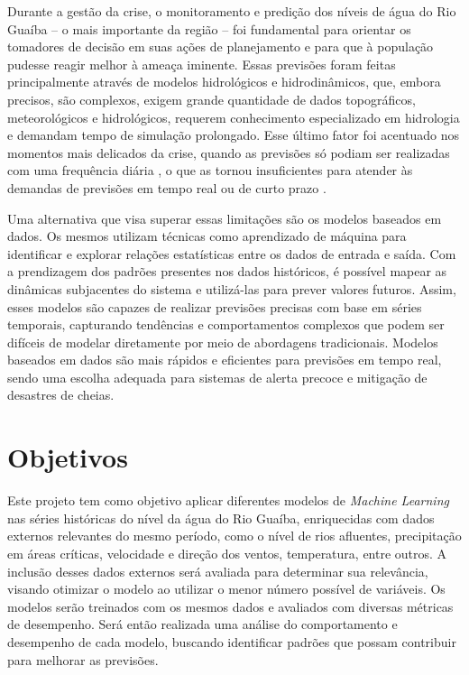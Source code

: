 \documentclass[
	12pt,				%
	openright,			%
	a4paper,			%
	english,			%
	french,				%
	spanish,			%
	brazil				%
	]{article}
\begin{document}
Durante a gestão da crise, o monitoramento e predição dos níveis de água do Rio Guaíba – o mais importante da região – 
foi fundamental para orientar os tomadores de decisão em suas ações de planejamento e para que à população pudesse 
reagir melhor à ameaça iminente. Essas previsões foram feitas principalmente através de modelos hidrológicos e 
hidrodinâmicos, que, embora precisos, são complexos, exigem grande quantidade de dados topográficos, meteorológicos e 
hidrológicos, requerem conhecimento especializado em hidrologia e demandam tempo de simulação prolongado. Esse último 
fator foi acentuado nos momentos mais delicados da crise, quando as previsões só podiam ser realizadas com uma 
frequência diária \cite{iph}, o que as tornou insuficientes para atender às demandas de previsões em tempo real ou de 
curto prazo \cite{atashi}.

Uma alternativa que visa superar essas limitações são os modelos baseados em dados. Os mesmos utilizam técnicas como 
aprendizado de máquina para identificar e explorar relações estatísticas entre os dados de entrada e saída. Com a 
prendizagem dos padrões presentes nos dados históricos, é possível mapear as dinâmicas subjacentes do sistema e 
utilizá-las para prever valores futuros. Assim, esses modelos são capazes de realizar previsões precisas com base em 
séries temporais, capturando tendências e comportamentos complexos que podem ser difíceis de modelar diretamente por 
meio de abordagens tradicionais. Modelos baseados em dados são mais rápidos e eficientes para previsões em tempo real, 
sendo uma escolha adequada para sistemas de alerta precoce e mitigação de desastres de cheias\cite{ta}.

\section{Objetivos}
Este projeto tem como objetivo aplicar diferentes modelos de \textit{Machine Learning} nas séries históricas do nível da 
água do Rio Guaíba, enriquecidas com dados externos relevantes do mesmo período, como o nível de rios afluentes, 
precipitação em áreas críticas, velocidade e direção dos ventos, temperatura, entre outros. A inclusão desses dados 
externos será avaliada para determinar sua relevância, visando otimizar o modelo ao utilizar o menor número possível de 
variáveis. Os modelos serão treinados com os mesmos dados e avaliados com diversas métricas de desempenho. Será então 
realizada uma análise do comportamento e desempenho de cada modelo, buscando identificar padrões que possam contribuir 
para melhorar as previsões.
\end{document}
